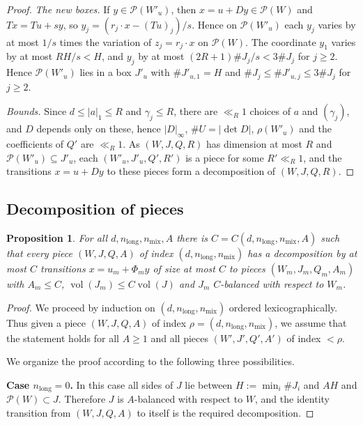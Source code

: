 \documentclass[a4paper,reqno,12pt]{amsart}
\theoremstyle{plain}
\newtheorem{proposition}[theorem]{Proposition}
\theoremstyle{plain}
\theoremstyle{remark}
\theoremstyle{plain}
\newcommand{\cP}{\mathscr{P}}
\newcommand{\vol}{\operatorname{vol}}
\theoremstyle{plain}
\theoremstyle{plain}
\begin{document}
{\begin{proof}
\emph{The new boxes.} If $y\in\cP(W'_u)$, then $x=u+Dy\in\cP(W)$ and $Tx=Tu+sy$, so
$y_j=(r_j\cdot x-(Tu)_j)/s$. Hence on $\cP(W'_u)$ each $y_j$ varies by at most $1/s$ times the variation
of $z_j=r_j\cdot x$ on $\cP(W)$. The coordinate $y_1$ varies by at most $RH/s<H$, and $y_j$ by at most $(2R+1)\#J_j/s<3\#J_j$
for $j\ge2$. Hence $\cP(W'_u)$ lies in a box $J'_u$ with $\#J'_{u,1}=H$ and
$\#J_j\le\#J'_{u,j}\le3\#J_j$ for $j\ge2$.

\emph{Bounds.} Since $d\le|a|_1\le R$ and $\gamma_j\le R$, there are $\ll_R1$ choices of $a$ and
$(\gamma_j)$, and $D$ depends only on these, hence $|D|_\infty$, $\#U=|\det D|$, $\rho(W'_u)$ and the
coefficients of $Q'$ are $\ll_R1$. As $(W,J,Q,R)$ has dimension at most $R$ and
$\cP(W'_u)\subseteq J'_u$, each $(W'_u,J'_u,Q',R')$ is a piece for some $R'\ll_R1$, and the transitions
$x=u+Dy$ to these pieces form a decomposition of $(W,J,Q,R)$.
\end{proof}

\subsection{Decomposition of pieces}\label{sec:pieces}

\begin{proposition}\label{prop:pieces}
For all $d,n_{\mathrm{long}},n_{\mathrm{mix}},A$ there is $C=C(d,n_{\mathrm{long}},n_{\mathrm{mix}},A)$ such that every piece $(W,J,Q,A)$ of
index $(d,n_{\mathrm{long}},n_{\mathrm{mix}})$ has a decomposition by at most $C$ transitions
$x=u_m+\Phi_my$ of size at most $C$ to pieces $(W_m,J_m,Q_m,A_m)$ with $A_m\le C$,
$\vol(J_m)\le C\vol(J)$ and $J_m$ $C$-balanced with respect to $W_m$.
\end{proposition}

\begin{proof}
We proceed by induction on $(d, n_{\text{long}}, n_{\text{mix}})$ ordered lexicographically. 
Thus given a piece $(W, J,  Q, A)$ of index $\rho = (d, n_{\text{long}}, n_{\text{mix}})$, we 
assume that the statement holds
for all $A \geq 1$ and all pieces $(W', J', Q', A')$ of index $< \rho$.  

We organize the proof according to the following three possibilities. 

\textbf{Case $n_{\text{long}} = 0$.} In this case all sides of $J$ lie between $H := \min_i \#J_i$ and
$A H$ and $\cP(W) \subset J$. Therefore $J$ is $A$-balanced with respect to $W$, and the identity transition
from $(W,J,Q,A)$ to itself is the required decomposition.


\end{proof}}
\end{document}
